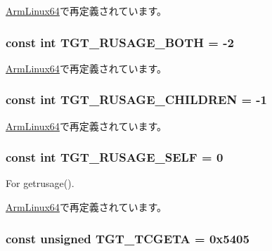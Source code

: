 \hyperlink{classArmLinux64_a599454267926920de3bd5a488bda3e03a08e62a1dfe173892d7a251c73a8a3f6a}{ArmLinux64}で再定義されています。\hypertarget{classLinux_af555fb2e49227259e6f6a78e2f6996e4}{
\subsubsection[{TGT\_\-RUSAGE\_\-BOTH}]{\setlength{\rightskip}{0pt plus 5cm}const int {\bf TGT\_\-RUSAGE\_\-BOTH} = -\/2}}
\label{classLinux_af555fb2e49227259e6f6a78e2f6996e4}


\hyperlink{classArmLinux64_af555fb2e49227259e6f6a78e2f6996e4}{ArmLinux64}で再定義されています。\hypertarget{classLinux_a9a340e7463be441b8aeb8ea0a109e1bc}{
\subsubsection[{TGT\_\-RUSAGE\_\-CHILDREN}]{\setlength{\rightskip}{0pt plus 5cm}const int {\bf TGT\_\-RUSAGE\_\-CHILDREN} = -\/1}}
\label{classLinux_a9a340e7463be441b8aeb8ea0a109e1bc}


\hyperlink{classArmLinux64_a9a340e7463be441b8aeb8ea0a109e1bc}{ArmLinux64}で再定義されています。\hypertarget{classLinux_a9e303b6c52672934210e6db497f0da88}{
\subsubsection[{TGT\_\-RUSAGE\_\-SELF}]{\setlength{\rightskip}{0pt plus 5cm}const int {\bf TGT\_\-RUSAGE\_\-SELF} = 0}}
\label{classLinux_a9e303b6c52672934210e6db497f0da88}


For getrusage(). 

\hyperlink{classArmLinux64_a9e303b6c52672934210e6db497f0da88}{ArmLinux64}で再定義されています。\hypertarget{classLinux_a804fc265279c5dbd78e0f95da998b267}{
\subsubsection[{TGT\_\-TCGETA}]{\setlength{\rightskip}{0pt plus 5cm}const unsigned {\bf TGT\_\-TCGETA} = 0x5405}}
\label{classLinux_a804fc265279c5dbd78e0f95da998b267}


